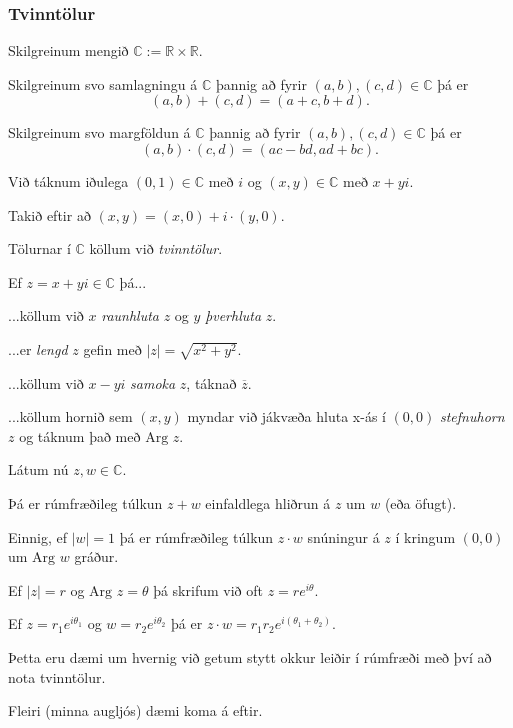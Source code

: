 {
	\frametitle{Tvinntölur}
	{
		\item<1-> Skilgreinum mengið $\mathbb{C} := \mathbb{R} \times \mathbb{R}$.
		\item<2-> Skilgreinum svo samlagningu á $\mathbb{C}$ þannig að fyrir $(a, b), (c, d) \in \mathbb{C}$ þá er
			\[
				(a, b) + (c, d) = (a + c, b + d).
			\]
		\item<3-> Skilgreinum svo margföldun á $\mathbb{C}$ þannig að fyrir $(a, b), (c, d) \in \mathbb{C}$ þá er
			\[
				(a, b) \cdot (c, d) = (ac - bd, ad + bc).
			\]
		\item<4-> Við táknum iðulega $(0, 1) \in \mathbb{C}$ með $i$ og $(x, y) \in \mathbb{C}$ með $x + yi$.
		\item<5-> Takið eftir að $(x, y) = (x, 0) + i \cdot (y, 0)$.
		\item<6-> Tölurnar í $\mathbb{C}$ köllum við \emph{tvinntölur}.
	}
}

{
	{
		\item<1-> Ef $z = x + yi \in \mathbb{C}$ þá...
		{
			\item<2-> ...köllum við $x$ \emph{raunhluta} $z$ og $y$ \emph{þverhluta} $z$.
			\item<3-> ...er \emph{lengd} $z$ gefin með $|z| = \sqrt{x^2 + y^2}$.
			\item<4-> ...köllum við $x - yi$ \emph{samoka} $z$, táknað $\overline{z}$.
			\item<5-> ...köllum hornið sem $(x, y)$ myndar við jákvæða hluta x-ás í $(0, 0)$ \emph{stefnuhorn} $z$
				og táknum það með $\text{Arg } z$.
		}
	}
}

{
	{
		\item<1-> Látum nú $z, w \in \mathbb{C}$.
		\item<2-> Þá er rúmfræðileg túlkun $z + w$ einfaldlega hliðrun á $z$ um $w$ (eða öfugt).
		\item<3-> Einnig, ef $|w| = 1$ þá er rúmfræðileg túlkun $z \cdot w$ snúningur á $z$ í kringum $(0, 0)$ um $\text{Arg } w$ gráður.
		\item<4-> Ef $|z| = r$ og $\text{Arg } z = \theta$ þá skrifum við oft $z = re^{i\theta}$.
		\item<5-> Ef $z = r_1e^{i\theta_1}$ og $w = r_2e^{i\theta_2}$ þá er $z \cdot w = r_1r_2e^{i(\theta_1 + \theta_2)}$.
		\item<6-> Þetta eru dæmi um hvernig við getum stytt okkur leiðir í rúmfræði með því að nota tvinntölur.
		\item<7-> Fleiri (minna augljós) dæmi koma á eftir.
	}
}

